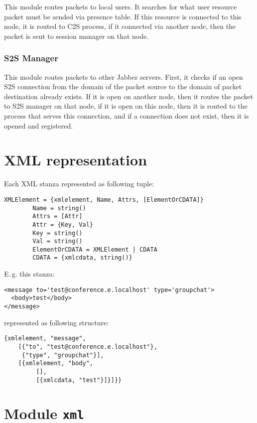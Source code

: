 \documentclass[10pt]{article}
\newcommand{\Jabber}{Jabber}
\begin{document}
This module routes packets to local users.  It searches for what user resource
packet must be sended via presence table.  If this resource is connected to
this node, it is routed to C2S process, if it connected via another node, then
the packet is sent to session manager on that node.


\subsubsection{S2S Manager}

This module routes packets to other \Jabber{} servers.  First, it checks if an
open S2S connection from the domain of the packet source to the domain of
packet destination already exists. If it is open on another node, then it
routes the packet to S2S manager on that node, if it is open on this node, then
it is routed to the process that serves this connection, and if a connection
does not exist, then it is opened and registered.




\section{XML representation}
\label{sec:xmlrepr}

Each XML stanza represented as following tuple:
\begin{verbatim}
XMLElement = {xmlelement, Name, Attrs, [ElementOrCDATA]}
        Name = string()
        Attrs = [Attr]
        Attr = {Key, Val}
        Key = string()
        Val = string()
        ElementOrCDATA = XMLElement | CDATA
        CDATA = {xmlcdata, string()}
\end{verbatim}
E.\,g. this stanza:
\begin{verbatim}
<message to='test@conference.e.localhost' type='groupchat'>
  <body>test</body>
</message>
\end{verbatim}
represented as following structure:
\begin{verbatim}
{xmlelement, "message",
    [{"to", "test@conference.e.localhost"},
     {"type", "groupchat"}],
    [{xmlelement, "body",
         [],
         [{xmlcdata, "test"}]}]}}
\end{verbatim}



\section{Module \texttt{xml}}
\label{sec:xmlmod}
\end{document}
